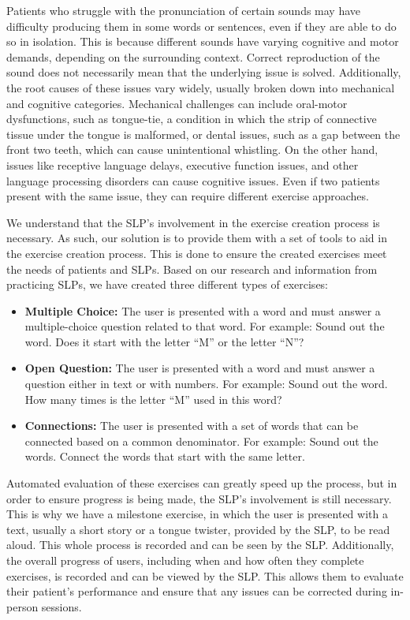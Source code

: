 Patients who struggle with the pronunciation of certain sounds may have difficulty producing them in some words or sentences, even if they are able to do so in isolation. This is because different sounds have varying cognitive and motor demands, depending on the surrounding context. Correct reproduction of the sound does not necessarily mean that the underlying issue is solved. Additionally, the root causes of these issues vary widely, usually broken down into mechanical and cognitive categories. Mechanical challenges can include oral-motor dysfunctions, such as tongue-tie, a condition in which the strip of connective tissue under the tongue is malformed, or dental issues, such as a gap between the front two teeth, which can cause unintentional whistling. On the other hand, issues like receptive language delays, executive function issues, and other language processing disorders can cause cognitive issues. Even if two patients present with the same issue, they can require different exercise approaches.

We understand that the SLP's involvement in the exercise creation process is necessary. As such, our solution is to provide them with a set of tools to aid in the exercise creation process. This is done to ensure the created exercises meet the needs of patients and SLPs. Based on our research and information from practicing SLPs, we have created three different types of exercises:

\begin{itemize}
    \item \textbf{Multiple Choice:} The user is presented with a word and must answer a multiple-choice question related to that word. For example: Sound out the word. Does it start with the letter ``M'' or the letter ``N''?
    \item \textbf{Open Question:} The user is presented with a word and must answer a question either in text or with numbers. For example: Sound out the word. How many times is the letter ``M'' used in this word?
    \item \textbf{Connections:} The user is presented with a set of words that can be connected based on a common denominator. For example: Sound out the words. Connect the words that start with the same letter.
\end{itemize}

Automated evaluation of these exercises can greatly speed up the process, but in order to ensure progress is being made, the SLP's involvement is still necessary. This is why we have a milestone exercise, in which the user is presented with a text, usually a short story or a tongue twister, provided by the SLP, to be read aloud. This whole process is recorded and can be seen by the SLP. Additionally, the overall progress of users, including when and how often they complete exercises, is recorded and can be viewed by the SLP. This allows them to evaluate their patient's performance and ensure that any issues can be corrected during in-person sessions.
